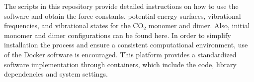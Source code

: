 \documentclass[aip,jcp,showpacs,superscriptaddress,groupedaddress]{revtex4-1}  %
\begin{document}
The scripts in this repository provide detailed instructions on how to use the software and obtain the force constants, potential energy surfaces, vibrational frequencies, and vibrational states for the CO$_2$ monomer and dimer. Also, initial monomer and dimer configurations can be found here. In order to simplify installation the process and ensure a consistent computational environment, use of the Docker software\cite{} is encouraged. This platform provides a standardized software implementation through containers, which include the code, library dependencies and system settings.






%
\end{document}
